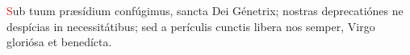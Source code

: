 \textcolor{red}{S}ub tuum pr{\ae}sídium confúgimus, sancta Dei Génetrix; nostras deprecatiónes ne despícias
in necessitátibus; sed a perículis cunctis libera nos semper, Virgo gloriósa et benedícta.